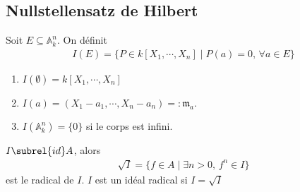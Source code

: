         \subsection{Nullstellensatz de Hilbert}
            \begin{defi}
                Soit $E \subseteq \mathbb{A}_k^n$. On définit
                \begin{align*}
                    I(E) = \{P \in k[X_1, \cdots, X_n] \mid P(a) = 0 ,\, \forall a \in E\}
                \end{align*}
            \end{defi}
            \begin{expl}
                \begin{enumerate}
                    \item $I(\emptyset) = k[X_1, \cdots, X_n]$
                    \item $I(a) = (X_1 - a_1, \cdots, X_n - a_n) =: \mathfrak{m}_a$. 
                    \item $I(\mathbb{A}_k^n) = \{0\}$ si le corps est infini.
                \end{enumerate}
            \end{expl}
            \begin{defi}
                $I \subrel{id} A$, alors 
                \begin{align*}
                    \sqrt{I} = \{f \in A \mid \exists n > 0,\, f^n \in I\}
                \end{align*}
                est le radical de $I$. $I$ est un idéal radical si $I = \sqrt{I}$
            \end{defi}
